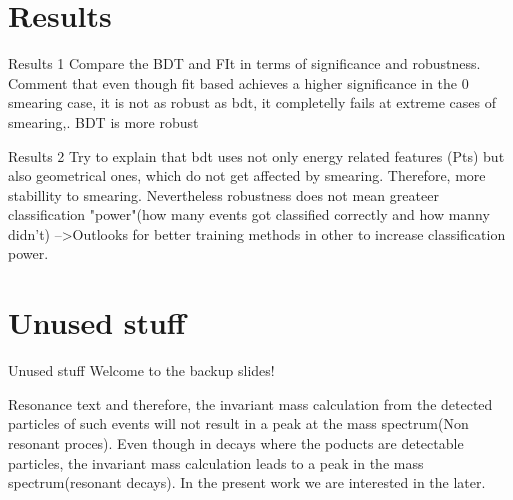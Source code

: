 \documentclass[bigger]{beamer}
\begin{document}
\section{Results}
\label{sec:org157a95e}
\begin{frame}[label={sec:orgdf3f139}]{Results 1}
Compare the BDT and FIt in terms of significance and robustness. Comment that even though fit based achieves a higher significance in the 0 smearing case, it is not as robust as bdt, it completelly fails at extreme cases of smearing,. BDT is more robust 
\end{frame}
\begin{frame}[label={sec:org53992a3}]{Results 2}
Try to explain that bdt uses not only energy related features (Pts) but also geometrical ones, which do not get affected by smearing. Therefore, more stabillity to smearing. Nevertheless robustness does not mean greateer classification "power"(how many events got classified correctly and how manny didn't) -->Outlooks for better training methods in other to increase classification power.   
\end{frame}
\section{Unused stuff}
\label{sec:org810ab9a}
\begin{frame}[label={sec:org247ee24}]{Unused stuff}
\alert{Welcome to the backup slides!}
\end{frame}
\begin{frame}[label={sec:org2f9ca01}]{Resonance text}
and therefore, the invariant mass calculation from the detected particles of such events will not result in a peak at the mass spectrum(Non resonant proces). Even though in decays where  the poducts are detectable particles, the invariant mass calculation leads to a peak in the mass spectrum(resonant decays). In the present work we are interested in the later.
\end{frame}
\end{document}
